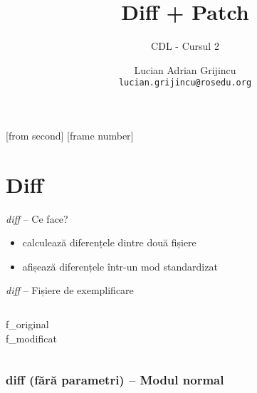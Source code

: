 \documentclass{beamer}
\title[Diff \+ Patch]{Diff + Patch}
\subtitle{CDL - Cursul 2}
\institute{ROSEdu}
\author{Lucian Adrian Grijincu \\ \texttt{lucian.grijincu@rosedu.org}}
\begin{document}
[from second]
[frame number]

\frame{\titlepage}

\frame{\tableofcontents}

\section{Diff}

\frame{\tableofcontents[currentsection]}

\begin{frame}{\textit{diff} – Ce face?}
\begin{itemize} %
  \item calculează diferențele dintre două fișiere
  \item afișează diferențele într-un mod standardizat
\end{itemize}
\end{frame}


\begin{frame}{\textit{diff} – Fișiere de exemplificare}
  \begin{columns}[t]
    \column{5cm}
    {\LARGE{f\_original}}\\
    {\tt{\small }}
    \column{5cm}
    {\LARGE{f\_modificat}}\\
    {\tt \small }
  \end{columns}
\end{frame}

\begin{frame}
  \frametitle{\textbf{diff} (fără parametri) – Modul normal}
  \tt 
\end{frame}
\end{document}
